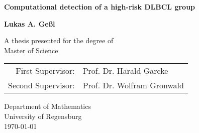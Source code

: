 \documentclass[10.5pt, a4paper, oneside]{report}
\begin{document}
    \begin{titlepage}
        \centering
        \vspace*{1cm}
        
        \huge
        \textsf{
        \textbf{Computational detection of a high-risk DLBCL group}
        }
        
        \vspace{1.5cm}
        
        \large
        \textbf{Lukas A. Geßl}
        
        \vfill
        
        \large
        A thesis presented for the degree of\\
        Master of Science
        
        \vspace{0.8cm}
        
        \begin{tabular}{rl}
            First Supervisor: & Prof. Dr. Harald Garcke \\
            Second Supervisor: & Prof. Dr. Wolfram Gronwald \\
        \end{tabular}
        
        \vspace{0.8cm}
        
        Department of Mathematics\\
        University of Regensburg\\
        \vspace{0.8cm}
        \today
        
    \end{titlepage}

    \layout
    \tableofcontents
    
    
    
    

    
\end{document}
